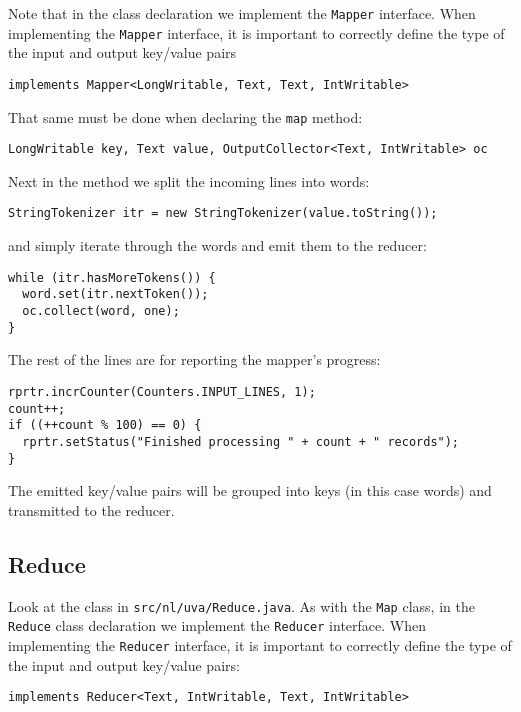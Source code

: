 \documentclass[a4paper,10pt]{article}
\begin{document}
Note that in the class declaration we implement the \texttt{Mapper} interface. When implementing the \texttt{Mapper} interface, it is important to correctly define the type of the input and output key/value pairs
\begin{lstlisting}
implements Mapper<LongWritable, Text, Text, IntWritable> 
\end{lstlisting}

That same must be done when declaring the \texttt{map} method:
\begin{lstlisting}
LongWritable key, Text value, OutputCollector<Text, IntWritable> oc
\end{lstlisting}


Next in the method we split the incoming lines into words:
\begin{lstlisting}
StringTokenizer itr = new StringTokenizer(value.toString());
\end{lstlisting}

and simply iterate through the words and emit them to the reducer: 
\begin{lstlisting}
while (itr.hasMoreTokens()) {
  word.set(itr.nextToken());
  oc.collect(word, one);
}
\end{lstlisting}


The rest of the lines are for reporting the mapper's progress:

\begin{lstlisting}
rprtr.incrCounter(Counters.INPUT_LINES, 1);
count++;
if ((++count % 100) == 0) {
  rprtr.setStatus("Finished processing " + count + " records");
}
\end{lstlisting}


The emitted key/value pairs will be grouped into keys (in this case words) and transmitted to the reducer. 
% 

\subsection{Reduce}

Look at the class in \texttt{src/nl/uva/Reduce.java}. As with the \texttt{Map} class, in the \texttt{Reduce} class declaration we implement the \texttt{Reducer} interface. When implementing the \texttt{Reducer} interface, it is important to correctly define the type of the input and output key/value pairs:
\begin{lstlisting}
implements Reducer<Text, IntWritable, Text, IntWritable> 
\end{lstlisting}
\end{document}
